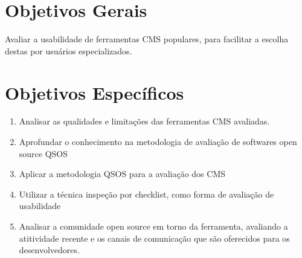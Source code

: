 \section{Objetivos Gerais}

Avaliar a usabilidade de ferramentas CMS populares, para facilitar a escolha destas por usuários especializados.



\section{Objetivos Específicos}

\begin{enumerate}

\item Analisar as qualidades e limitações das ferramentas CMS avaliadas.
\item Aprofundar o conhecimento na metodologia de avaliação de softwares open source QSOS
\item Aplicar a metodologia QSOS para a avaliação dos CMS
\item Utilizar a técnica inspeção por checklist, como forma de avaliação de usabilidade
\item Analisar a comunidade open source em torno da ferramenta, avaliando a atitividade recente e os canais de comunicação que são oferecidos para os desenvolvedores.

\end{enumerate}
